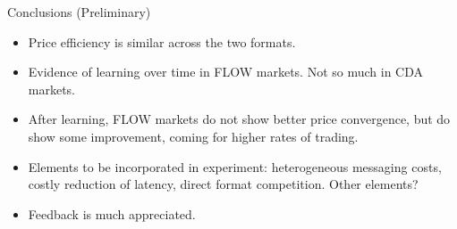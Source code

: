 \documentclass[10pt]{beamer}
\begin{document}
\begin{frame}{Conclusions (Preliminary)}
    \begin{itemize}
    \item Price efficiency is similar across the two formats.
    \item Evidence of learning over time in FLOW markets. Not so much in CDA markets.
    \item After learning, FLOW markets do not show better price convergence, but do show some improvement, coming for higher rates of trading.
    \item Elements to be incorporated in experiment: heterogeneous messaging costs, costly reduction of latency, direct format competition. Other elements?
    \item Feedback is much appreciated.
    \end{itemize} 
\end{frame}
\end{document}
